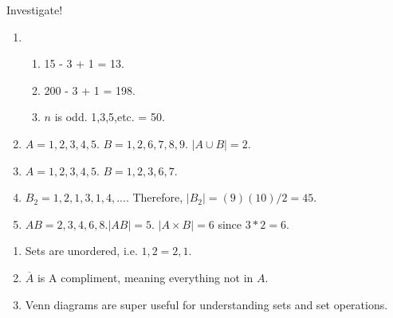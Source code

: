 \begin{mdframed}Investigate!
\begin{enumerate}
    \item \begin{enumerate}
        \item 15 - 3 + 1 = 13.
        \item 200 - 3 + 1 = 198.
        \item $n$ is odd. 1,3,5,etc. = 50.
    \end{enumerate}
    \item $A = {1,2,3,4,5}$. $B = {1,2,6,7,8,9}$. $|A \cup  B| = 2$.
    \item $A = {1,2,3,4,5}$. $B = {1,2,3,6,7}$.
    \item $B_2 = {{1,2},{1,3},{1,4},...}$. Therefore, $|B_2| = (9)(10)/2 = 45$.
    \item $AB = {2,3,4,6,8}. |AB| = 5$. $ |A \times B| = 6 $ since $ 3 * 2 = 6$.
\end{enumerate}
\end{mdframed}

\begin{enumerate}
    \item Sets are unordered, i.e. ${1,2} = {2,1}$.
    \item $\overline{A}$ is A compliment, meaning everything not in $A$.
    \item Venn diagrams are super useful for understanding sets and set operations.
\end{enumerate}
